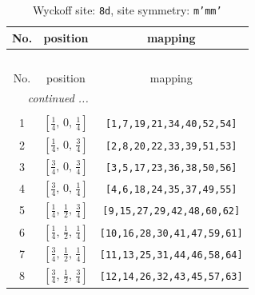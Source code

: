 \documentclass[fleqn,8pt]{jsarticle}
\begin{document}
\begin{longtable}{ccc}
\caption{Wyckoff site: {\tt 8d}, site symmetry: {\tt m'mm'}}
 \\
 \hline \hline
No. & position & mapping \\ \hline \endfirsthead

\multicolumn{2}{l}{\tablename\ \thetable{}} \\
 \hline \hline
No. & position & mapping \\ \hline \endhead

 \hline \hline
\multicolumn{2}{r}{\footnotesize\it continued ...} \\ \endfoot

 \hline \hline
\multicolumn{2}{r}{} \\ \endlastfoot

1 & $\left[ \frac{1}{4},\, 0,\, \frac{1}{4} \right]$ & {\tt [1,7,19,21,34,40,52,54]} \\ \hline
2 & $\left[ \frac{1}{4},\, 0,\, \frac{3}{4} \right]$ & {\tt [2,8,20,22,33,39,51,53]} \\ \hline
3 & $\left[ \frac{3}{4},\, 0,\, \frac{3}{4} \right]$ & {\tt [3,5,17,23,36,38,50,56]} \\ \hline
4 & $\left[ \frac{3}{4},\, 0,\, \frac{1}{4} \right]$ & {\tt [4,6,18,24,35,37,49,55]} \\ \hline
5 & $\left[ \frac{1}{4},\, \frac{1}{2},\, \frac{3}{4} \right]$ & {\tt [9,15,27,29,42,48,60,62]} \\ \hline
6 & $\left[ \frac{1}{4},\, \frac{1}{2},\, \frac{1}{4} \right]$ & {\tt [10,16,28,30,41,47,59,61]} \\ \hline
7 & $\left[ \frac{3}{4},\, \frac{1}{2},\, \frac{1}{4} \right]$ & {\tt [11,13,25,31,44,46,58,64]} \\ \hline
8 & $\left[ \frac{3}{4},\, \frac{1}{2},\, \frac{3}{4} \right]$ & {\tt [12,14,26,32,43,45,57,63]} \\
\end{longtable}
\renewcommand{\arraystretch}{1.2}
\end{document}
